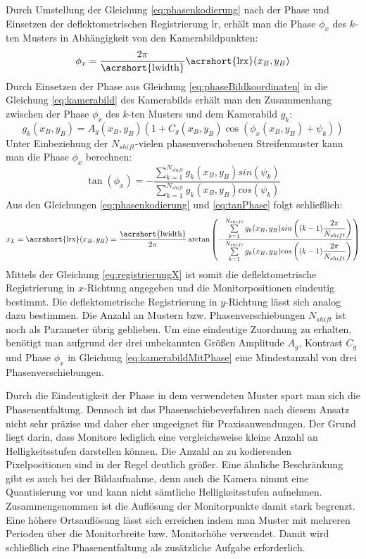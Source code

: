 \p
Durch Umstellung der Gleichung \ref{eq:phasenkodierung} nach der Phase und Einsetzen der deflektometrischen Registrierung \acrshort{lr}, erhält man die Phase $\phi_x$ des $k$-ten Musters in Abhängigkeit von den Kamerabildpunkten:
%
\begin{equation}\label{eq:phaseBildkoordinaten}
	\phi_x = \dfrac{2\pi}{\text{\acrshort{lwidth}}}\text{\acrshort{lrx}}(x_B, y_B)
\end{equation}
%
Durch Einsetzen der Phase aus Gleichung \ref{eq:phaseBildkoordinaten} in die Gleichung \ref{eq:kamerabild} des Kamerabilds erhält man den Zusammenhang zwischen der Phase $\phi_x$ des $k$-ten Musters und dem Kamerabild   $g_k$:
%
\begin{equation}\label{eq:kamerabildMitPhase}
	g_k(x_B, y_B) = A_g(x_B, y_B) \left(1 + C_g(x_B, y_B) \cos \left(\phi_x(x_B, y_B) + \psi_k\right)\right)
\end{equation}
%
Unter Einbeziehung der $N_{shift}$-vielen phasenverschobenen Streifenmuster kann man die Phase $\phi_x$ berechnen:
%
\begin{equation}\label{eq:tanPhase}
	\tan (\phi_x) = -\dfrac{\sum\limits_{k=1}^{N_{shift}} g_k(x_B, y_B) sin(\psi_k)}{\sum\limits_{k=1}^{N_{shift}} g_k(x_B, y_B) cos(\psi_k)}
\end{equation}
%
Aus den Gleichungen \ref{eq:phasenkodierung} und \ref{eq:tanPhase} folgt schließlich:
%
\begin{equation}\label{eq:registrierungX}
	x_L = \text{\acrshort{lrx}}(x_B, y_B) = 
	\dfrac{\text{\acrshort{lwidth}}}{2\pi}
	\arctan 
	\left( 
		-\dfrac
		{\sum\limits_{k=1}^{N_{shift}} g_k(x_B, y_B) sin\left((k - 1)\dfrac{2\pi}{N_{shift}}\right)}
		{\sum\limits_{k=1}^{N_{shift}} g_k(x_B, y_B) cos\left((k - 1)\dfrac{2\pi}{N_{shift}}\right)}
	\right)
\end{equation}
%
Mittels der Gleichung \ref{eq:registrierungX} ist somit die deflektometrische Registrierung in $x$-Richtung angegeben und die Monitorpositionen eindeutig bestimmt.
Die deflektometrische Registrierung in $y$-Richtung lässt sich analog dazu bestimmen.
Die Anzahl an Mustern bzw. Phasenverschiebungen $N_{shift}$ ist noch als Parameter übrig geblieben.
Um eine eindeutige Zuordnung zu erhalten, benötigt man aufgrund der drei unbekannten Größen Amplitude $A_g$, Kontrast $C_g$ und Phase $\phi_x$ in Gleichung \ref{eq:kamerabildMitPhase} eine Mindestanzahl von drei Phasenverschiebungen.

\p
Durch die Eindeutigkeit der Phase in dem verwendeten Muster spart man sich die Phasenentfaltung.
Dennoch ist das Phasenschiebeverfahren nach diesem Ansatz nicht sehr präzise und daher eher ungeeignet für Praxisanwendungen.
Der Grund liegt darin, dass Monitore lediglich eine vergleichsweise kleine Anzahl an Helligkeitsstufen darstellen können.
Die Anzahl an zu kodierenden Pixelpositionen sind in der Regel deutlich größer.
Eine ähnliche Beschränkung gibt es auch bei der Bildaufnahme, denn auch die Kamera nimmt eine Quantisierung vor und kann nicht sämtliche Helligkeitsstufen aufnehmen.
Zusammengenommen ist die Auflösung der Monitorpunkte damit stark begrenzt.
Eine höhere Ortsauflösung lässt sich erreichen indem man Muster mit mehreren Perioden über die Monitorbreite bzw. Monitorhöhe verwendet.
Damit wird schließlich eine Phasenentfaltung als zusätzliche Aufgabe erforderlich.